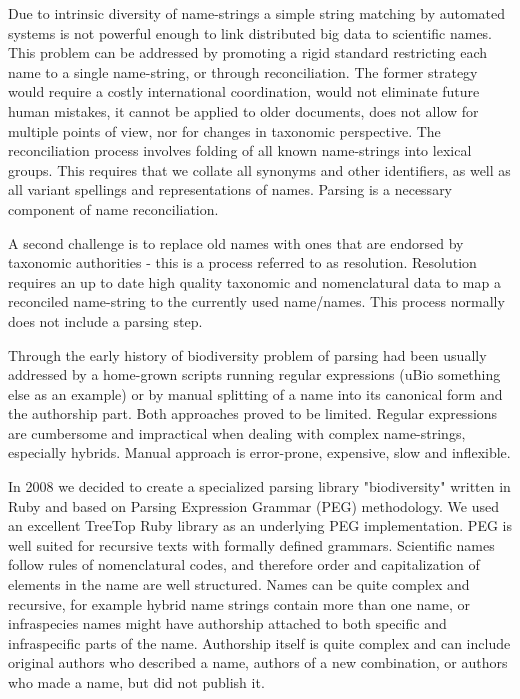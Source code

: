 \documentclass{bmcart}
\begin{document}
Due to intrinsic diversity of name-strings a simple string matching by
automated systems is not powerful enough to link distributed big data to
scientific names. This problem can be addressed by promoting a rigid standard
restricting each name to a single name-string, or through reconciliation. The
former strategy would require a costly international coordination, would not
eliminate future human mistakes, it cannot be applied to older documents, does
not allow for multiple points of view, nor for changes in taxonomic
perspective.  The reconciliation process involves folding of all known
name-strings into lexical groups.  This requires that we collate all synonyms
and other identifiers, as well as all variant spellings and representations of
names. Parsing is a necessary component of name reconciliation.

A second challenge is to replace old names with ones that are endorsed by
taxonomic authorities - this is a process referred to as resolution. Resolution
requires an up to date high quality taxonomic and nomenclatural data to map a
reconciled name-string to the currently used name/names. This process normally
does not include a parsing step.

Through the early history of biodiversity problem of parsing had been usually
addressed by a home-grown scripts running regular expressions (uBio something
else as an example) or by manual splitting of a name into its canonical form
and the authorship part. Both approaches proved to be limited. Regular
expressions are cumbersome and impractical when dealing with complex
name-strings, especially hybrids. Manual approach is error-prone, expensive,
slow and inflexible.

In 2008 we decided to create a specialized parsing library "biodiversity"
written in Ruby and based on Parsing Expression Grammar (PEG) methodology. We
used an excellent TreeTop Ruby library as an underlying PEG implementation. PEG
is well suited for recursive texts with formally defined grammars. Scientific
names follow rules of nomenclatural codes, and therefore order and
capitalization of elements in the name are well structured. Names can be quite
complex and recursive, for example hybrid name strings contain more than one
name, or infraspecies names might have authorship attached to both specific and
infraspecific parts of the name. Authorship itself is quite complex and can
include original authors who described a name, authors of a new combination, or
authors who made a name, but did not publish it.
\end{document}
